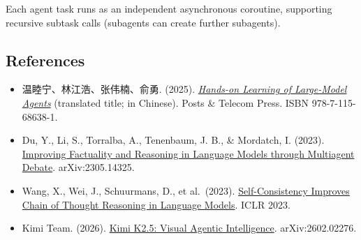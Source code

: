 Each agent task runs as an independent asynchronous coroutine, supporting recursive subtask calls (subagents can create further subagents).

\FloatBarrier
{}
\hypertarget{references-116}{%
\subsection{References}\label{references-116}}

\vspace{0.25em}
\begin{itemize}
\tightlist
\item
  温睦宁、林江浩、张伟楠、俞勇. (2025). \href{https://haa.boyuai.com/}{\emph{Hands-on Learning of Large-Model Agents}} (translated title; in Chinese). Posts \& Telecom Press. ISBN 978-7-115-68638-1.
\item
  Du, Y., Li, S., Torralba, A., Tenenbaum, J. B., \& Mordatch, I. (2023). \href{https://arxiv.org/abs/2305.14325}{Improving Factuality and Reasoning in Language Models through Multiagent Debate}. arXiv:2305.14325.
\item
  Wang, X., Wei, J., Schuurmans, D., et al.~(2023). \href{https://openreview.net/forum?id=1PL1NIMMrw}{Self-Consistency Improves Chain of Thought Reasoning in Language Models}. ICLR 2023.
\item
  Kimi Team. (2026). \href{https://arxiv.org/abs/2602.02276}{Kimi K2.5: Visual Agentic Intelligence}. arXiv:2602.02276.
\end{itemize}

\clearpage
